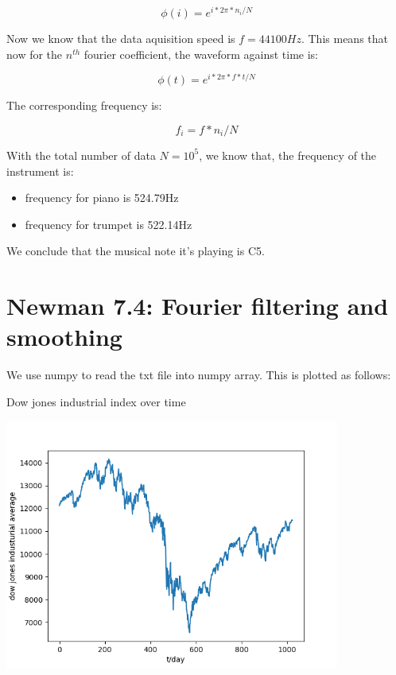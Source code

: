 \documentclass[letterpaper,12pt]{article}
\begin{document}
\begin{equation}
    \phi(i) = e^{i*2\pi*n_i/N}
\end{equation}

Now we know that the data aquisition speed is $f = 44100 Hz$. This means that now for the $n^{th}$ fourier coefficient, the waveform against time is:

\begin{equation}
    \phi(t) = e^{i*2\pi*f*t/N}
\end{equation}

The corresponding frequency is:

\begin{equation}
    f_i = f * n_i/N
\end{equation}

With the total number of data $N = 10^5$, we know that, the frequency of the instrument is:

\begin{itemize}
    \item frequency for piano is 524.79Hz
    \item frequency for trumpet is 522.14Hz
\end{itemize}

We conclude that the musical note it's playing is C5.




\section{Newman 7.4: Fourier filtering and smoothing}

We use numpy to read the txt file into numpy array. This is plotted as follows:

\begin{table}[!h]
    \centering
    \caption{Dow jones industrial index over time}
    \includegraphics[width=11cm]{8-3-1.png}
\end{table}%
\newpage
\end{document}
